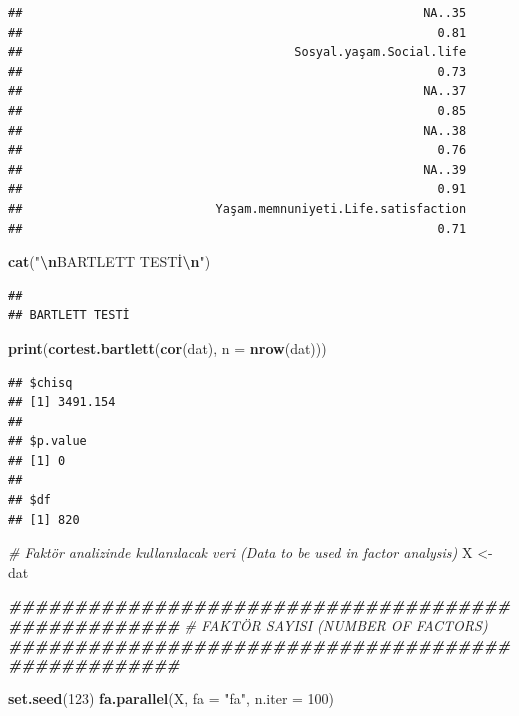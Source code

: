 \documentclass[
]{article}
\newenvironment{Shaded}{\begin{snugshade}}{\end{snugshade}}
\newcommand{\AttributeTok}[1]{\textcolor[rgb]{0.13,0.29,0.53}{#1}}
\newcommand{\CommentTok}[1]{\textcolor[rgb]{0.56,0.35,0.01}{\textit{#1}}}
\newcommand{\DecValTok}[1]{\textcolor[rgb]{0.00,0.00,0.81}{#1}}
\newcommand{\DocumentationTok}[1]{\textcolor[rgb]{0.56,0.35,0.01}{\textbf{\textit{#1}}}}
\newcommand{\FunctionTok}[1]{\textcolor[rgb]{0.13,0.29,0.53}{\textbf{#1}}}
\newcommand{\NormalTok}[1]{#1}
\newcommand{\OtherTok}[1]{\textcolor[rgb]{0.56,0.35,0.01}{#1}}
\newcommand{\SpecialCharTok}[1]{\textcolor[rgb]{0.81,0.36,0.00}{\textbf{#1}}}
\newcommand{\StringTok}[1]{\textcolor[rgb]{0.31,0.60,0.02}{#1}}
\begin{document}
\begin{verbatim}
##                                                        NA..35 
##                                                          0.81 
##                                      Sosyal.yaşam.Social.life 
##                                                          0.73 
##                                                        NA..37 
##                                                          0.85 
##                                                        NA..38 
##                                                          0.76 
##                                                        NA..39 
##                                                          0.91 
##                           Yaşam.memnuniyeti.Life.satisfaction 
##                                                          0.71
\end{verbatim}

\begin{Shaded}
\begin{Highlighting}[]
\FunctionTok{cat}\NormalTok{(}\StringTok{"}\SpecialCharTok{\textbackslash{}n}\StringTok{BARTLETT TESTİ}\SpecialCharTok{\textbackslash{}n}\StringTok{"}\NormalTok{)}
\end{Highlighting}
\end{Shaded}

\begin{verbatim}
## 
## BARTLETT TESTİ
\end{verbatim}

\begin{Shaded}
\begin{Highlighting}[]
\FunctionTok{print}\NormalTok{(}\FunctionTok{cortest.bartlett}\NormalTok{(}\FunctionTok{cor}\NormalTok{(dat), }\AttributeTok{n =} \FunctionTok{nrow}\NormalTok{(dat)))}
\end{Highlighting}
\end{Shaded}

\begin{verbatim}
## $chisq
## [1] 3491.154
## 
## $p.value
## [1] 0
## 
## $df
## [1] 820
\end{verbatim}

\begin{Shaded}
\begin{Highlighting}[]
\CommentTok{\# Faktör analizinde kullanılacak veri (Data to be used in factor analysis)}
\NormalTok{X }\OtherTok{\textless{}{-}}\NormalTok{ dat}


\DocumentationTok{\#\#\#\#\#\#\#\#\#\#\#\#\#\#\#\#\#\#\#\#\#\#\#\#\#\#\#\#\#\#\#\#\#\#\#\#\#\#\#\#\#\#\#\#\#\#\#\#\#\#\#}
\CommentTok{\# FAKTÖR SAYISI (NUMBER OF FACTORS)}
\DocumentationTok{\#\#\#\#\#\#\#\#\#\#\#\#\#\#\#\#\#\#\#\#\#\#\#\#\#\#\#\#\#\#\#\#\#\#\#\#\#\#\#\#\#\#\#\#\#\#\#\#\#\#\#}

\FunctionTok{set.seed}\NormalTok{(}\DecValTok{123}\NormalTok{)}
\FunctionTok{fa.parallel}\NormalTok{(X, }\AttributeTok{fa =} \StringTok{"fa"}\NormalTok{, }\AttributeTok{n.iter =} \DecValTok{100}\NormalTok{)}
\end{Highlighting}
\end{Shaded}
\end{document}
